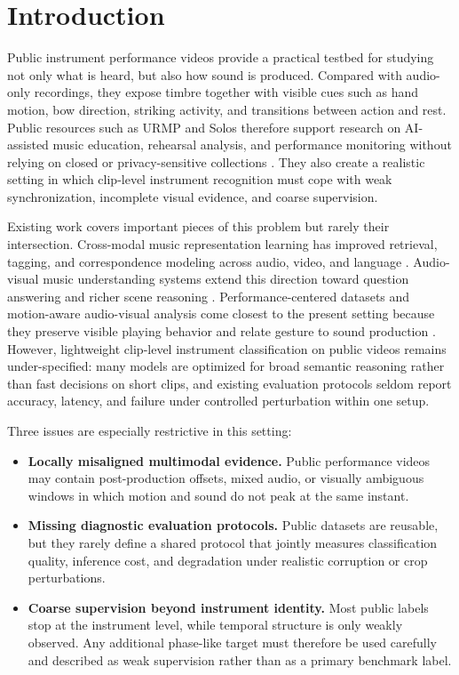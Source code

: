 \section{Introduction}
\label{sec:introduction}

Public instrument performance videos provide a practical testbed for studying not only what is heard, but also how sound is produced. Compared with audio-only recordings, they expose timbre together with visible cues such as hand motion, bow direction, striking activity, and transitions between action and rest. Public resources such as URMP and Solos therefore support research on AI-assisted music education, rehearsal analysis, and performance monitoring without relying on closed or privacy-sensitive collections \citep{Li2019URMP,Montesinos2020Solos}. They also create a realistic setting in which clip-level instrument recognition must cope with weak synchronization, incomplete visual evidence, and coarse supervision.

Existing work covers important pieces of this problem but rarely their intersection. Cross-modal music representation learning has improved retrieval, tagging, and correspondence modeling across audio, video, and language \citep{Simonetta2019Survey,Muller2019CrossModalSurvey,Oramas2018Genre,Zeng2018AVMusicRetrieval,Suris2022ArtisticCorrespondence,Manco2022CALLMusic}. Audio-visual music understanding systems extend this direction toward question answering and richer scene reasoning \citep{Li2022MusicAVQA,Diao2024MPQA,Mao2025DeepResonance,Chen2025MusiXQA}. Performance-centered datasets and motion-aware audio-visual analysis come closest to the present setting because they preserve visible playing behavior and relate gesture to sound production \citep{Li2019URMP,Montesinos2020Solos,Zhao2018SoundOfPixels,Gan2020MusicGesture}. However, lightweight clip-level instrument classification on public videos remains under-specified: many models are optimized for broad semantic reasoning rather than fast decisions on short clips, and existing evaluation protocols seldom report accuracy, latency, and failure under controlled perturbation within one setup.

Three issues are especially restrictive in this setting:
\begin{itemize}[leftmargin=*]
    \item \textbf{Locally misaligned multimodal evidence.} Public performance videos may contain post-production offsets, mixed audio, or visually ambiguous windows in which motion and sound do not peak at the same instant.
    \item \textbf{Missing diagnostic evaluation protocols.} Public datasets are reusable, but they rarely define a shared protocol that jointly measures classification quality, inference cost, and degradation under realistic corruption or crop perturbations.
    \item \textbf{Coarse supervision beyond instrument identity.} Most public labels stop at the instrument level, while temporal structure is only weakly observed. Any additional phase-like target must therefore be used carefully and described as weak supervision rather than as a primary benchmark label.
\end{itemize}

